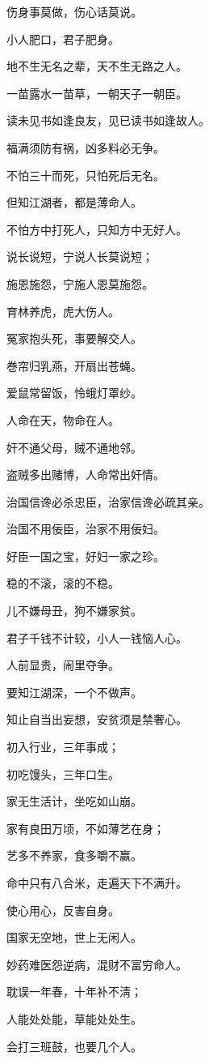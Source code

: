 \documentclass[12pt,oneside]{book}
\begin{document}
伤身事莫做，伤心话莫说。

小人肥口，君子肥身。

地不生无名之辈，天不生无路之人。

一苗露水一苗草，一朝天子一朝臣。

读未见书如逢良友，见已读书如逢故人。

福满须防有祸，凶多料必无争。

不怕三十而死，只怕死后无名。

但知江湖者，都是薄命人。

不怕方中打死人，只知方中无好人。

说长说短，宁说人长莫说短；

施恩施怨，宁施人恩莫施怨。

育林养虎，虎大伤人。

冤家抱头死，事要解交人。

巻帘归乳燕，开扇出苍蝇。

爱鼠常留饭，怜蛾灯罩纱。

人命在天，物命在人。

奸不通父母，贼不通地邻。

盗贼多出赌博，人命常出奸情。

治国信谗必杀忠臣，治家信谗必疏其亲。

治国不用佞臣，治家不用佞妇。

好臣一国之宝，好妇一家之珍。

稳的不滚，滚的不稳。

儿不嫌母丑，狗不嫌家贫。

君子千钱不计较，小人一钱恼人心。

人前显贵，闹里夺争。

要知江湖深，一个不做声。

知止自当出妄想，安贫须是禁奢心。

初入行业，三年事成；

初吃馒头，三年口生。

家无生活计，坐吃如山崩。

家有良田万顷，不如薄艺在身；

艺多不养家，食多嚼不赢。

命中只有八合米，走遍天下不满升。

使心用心，反害自身。

国家无空地，世上无闲人。

妙药难医怨逆病，混财不富穷命人。

耽误一年春，十年补不淸；

人能处处能，草能处处生。

会打三班鼓，也要几个人。
\end{document}

